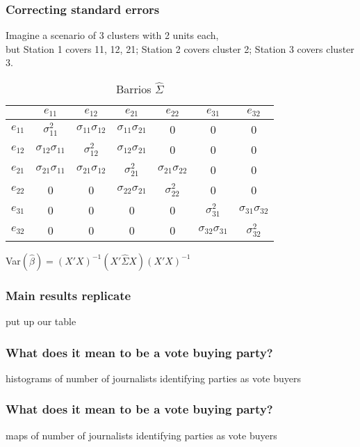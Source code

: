 \documentclass{beamer}
\begin{document}
\begin{frame}
\frametitle{Correcting standard errors}
Imagine a scenario of 3 clusters with 2 units each, \\
but Station 1 covers 11, 12, 21; Station 2 covers cluster 2; Station 3 covers cluster 3.
\begin{table}[h]
\caption{Barrios $\hat{\Sigma}$}
\begin{tabular}{ c|c c c c c c|}
 		 &  $e_{11}$ 		& $e_{12}$ 		& $e_{21}$ & $e_{22}$ & $e_{31}$ & $e_{32}$\\ \hline
$e_{11}$ & $\sigma_{11}^2$ & $\sigma_{11}\sigma_{12}$ 	   & $\sigma_{11}\sigma_{21}$ 		  & 0 		 & 0 		& 0 		\\
$e_{12}$ & $\sigma_{12}\sigma_{11}$  	 & $\sigma_{12}^2$ & $\sigma_{12}\sigma_{21}$ 		  & 0 		 & 0 		& 0 		\\
$e_{21}$ & $\sigma_{21}\sigma_{11}$  	& $\sigma_{21}\sigma_{12}$ 	   & $\sigma_{21}^2$ & $\sigma_{21}\sigma_{22}$ 		 & 0 		& 0 		\\
$e_{22}$ & 0			 & 0 	   & $\sigma_{22}\sigma_{21}$& $\sigma_{22}^2$ & 0 		& 0 		\\
$e_{31}$ & 0			 & 0 	   & 0 		  & 0 		 & $\sigma_{31}^2$ & $\sigma_{31}\sigma_{32}$\\
$e_{32}$ & 0			 & 0 	   & 0 		  & 0 		 & $\sigma_{32}\sigma_{31}$& $\sigma_{32}^2$ \\ \hline
\end{tabular}
\end{table}
Var$(\hat{\beta})=(X'X)^{-1}(X' \hat{\Sigma} X)(X'X)^{-1}$\\
\end{frame}

\begin{frame}
\frametitle{Main results replicate}

put up our table

\end{frame}



\begin{frame}
\frametitle{What does it mean to be a vote buying party?}

histograms of number of journalists identifying parties as vote buyers

\end{frame}


\begin{frame}
\frametitle{What does it mean to be a vote buying party?}

maps of number of journalists identifying parties as vote buyers

\end{frame}
\end{document}
